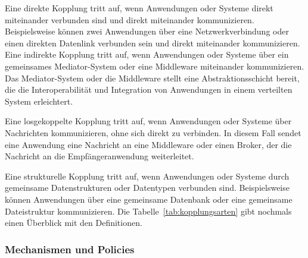 Eine direkte Kopplung tritt auf, wenn Anwendungen oder Systeme direkt miteinander verbunden sind und direkt miteinander kommunizieren. Beispielsweise können zwei Anwendungen über eine Netzwerkverbindung oder einen direkten Datenlink verbunden sein und direkt miteinander kommunizieren.
\\
Eine indirekte Kopplung tritt auf, wenn Anwendungen oder Systeme über ein gemeinsames Mediator-System oder eine Middleware miteinander kommunizieren. Das Mediator-System oder die Middleware stellt eine Abstraktionsschicht bereit, die die Interoperabilität und Integration von Anwendungen in einem verteilten System erleichtert.

Eine losgekoppelte Kopplung tritt auf, wenn Anwendungen oder Systeme über Nachrichten kommunizieren, ohne sich direkt zu verbinden. In diesem Fall sendet eine Anwendung eine Nachricht an eine Middleware oder einen Broker, der die Nachricht an die Empfängeranwendung weiterleitet.

Eine strukturelle Kopplung tritt auf, wenn Anwendungen oder Systeme durch gemeinsame Datenstrukturen oder Datentypen verbunden sind. Beispielsweise können Anwendungen über eine gemeinsame Datenbank oder eine gemeinsame Dateistruktur kommunizieren. Die Tabelle~\ref{tab:kopplungsarten} gibt nochmals einen Überblick mit den Definitionen. 

\subsubsection{Mechanismen und Policies}

